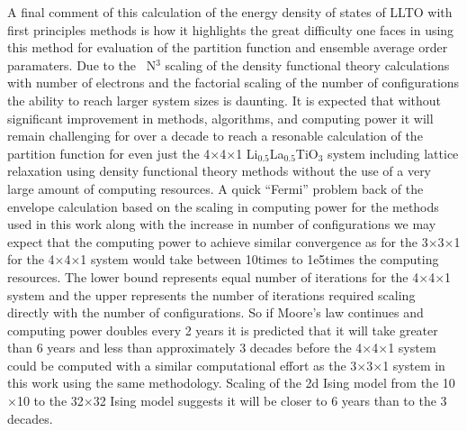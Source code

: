 \documentclass[aps,pre,reprint,superscriptaddress,showkeys]{revtex4-2}
\begin{document}
A final comment of this calculation of the energy density of states of LLTO with first principles methods is how it highlights the great difficulty one faces in using this method for evaluation of the partition function and ensemble average order paramaters. Due to the ~N$^3$ scaling of the density functional theory calculations with number of electrons and the factorial scaling of the number of configurations the ability to reach larger system sizes is daunting. It is expected that without significant improvement in methods, algorithms, and computing power it will remain challenging for over a decade to reach  a resonable calculation of the partition function for even just the 4$\times$4$\times$1 Li$_{0.5}$La$_{0.5}$TiO$_3$ system including lattice relaxation using density functional theory methods without the use of a very large amount of computing resources. A quick ``Fermi'' problem back of the envelope calculation based on the scaling in computing power for the methods used in this work along with the increase in number of configurations we may expect that the computing  power to achieve similar convergence as for the 3$\times$3$\times$1 for the 4$\times$4$\times$1 system would take between 10times to 1e5times  the computing resources. The lower bound represents equal number of iterations for the 4$\times$4$\times$1 system and the upper represents the number of iterations required scaling directly with the number of configurations.  So if Moore's law continues and computing power doubles every 2 years it is predicted that it will take greater than 6 years and less than approximately 3 decades before the 4$\times$4$\times$1 system could be computed with a similar computational effort as the 3$\times$3$\times$1 system in this work using the same methodology. Scaling of the 2d Ising model from the 10$\times$10 to the 32$\times$32 Ising model suggests it will be closer to 6 years than to the 3 decades. 
\end{document}
